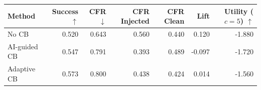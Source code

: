 \begin{tabular}{lrrrrrr}
\toprule
Method & Success $\uparrow$ & CFR $\downarrow$ & CFR Injected & CFR Clean & Lift & Utility ($c=5$) $\uparrow$ \\
\midrule
No CB & 0.520 & 0.643 & 0.560 & 0.440 & 0.120 & -1.880 \\
AI-guided CB & 0.547 & 0.791 & 0.393 & 0.489 & -0.097 & -1.720 \\
Adaptive CB & 0.573 & 0.800 & 0.438 & 0.424 & 0.014 & -1.560 \\
\bottomrule
\end{tabular}
